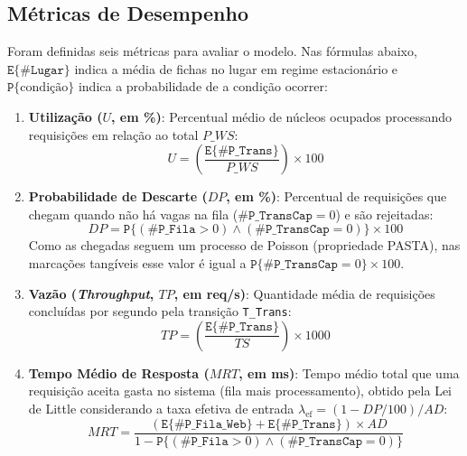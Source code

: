 \documentclass[conference,10pt]{IEEEtran}
\begin{document}
\subsection{Métricas de Desempenho}
Foram definidas seis métricas para avaliar o modelo. Nas fórmulas abaixo, $\texttt{E}\{\#\texttt{Lugar}\}$ indica a média de fichas no lugar em regime estacionário e $\texttt{P}\{\text{condição}\}$ indica a probabilidade de a condição ocorrer:

\begin{enumerate}
    \item \textbf{Utilização ($U$, em \%)}: Percentual médio de núcleos ocupados processando requisições em relação ao total $P\_WS$:
    \begin{equation}
        U = \left(\frac{\texttt{E}\{\#\texttt{P\_Trans}\}}{P\_WS}\right) \times 100
        \label{eq:u}
    \end{equation}

    \item \textbf{Probabilidade de Descarte ($DP$, em \%)}: Percentual de requisições que chegam quando não há vagas na fila ($\#\texttt{P\_TransCap} = 0$) e são rejeitadas:
    \begin{equation}
        DP = \texttt{P}\{(\#\texttt{P\_Fila} > 0) \land (\#\texttt{P\_TransCap} = 0)\} \times 100
        \label{eq:dp}
    \end{equation}
    Como as chegadas seguem um processo de Poisson (propriedade PASTA), nas marcações tangíveis esse valor é igual a $\texttt{P}\{\#\texttt{P\_TransCap} = 0\} \times 100$.

    \item \textbf{Vazão (\textit{Throughput}, $TP$, em req/s)}: Quantidade média de requisições concluídas por segundo pela transição \texttt{T\_Trans}:
    \begin{equation}
        TP = \left(\frac{\texttt{E}\{\#\texttt{P\_Trans}\}}{TS}\right) \times 1000
        \label{eq:tp}
    \end{equation}

    \item \textbf{Tempo Médio de Resposta ($MRT$, em ms)}: Tempo médio total que uma requisição aceita gasta no sistema (fila mais processamento), obtido pela Lei de Little considerando a taxa efetiva de entrada $\lambda_{\text{ef}} = (1 - DP/100)/AD$:
    \begin{equation}
        MRT = \frac{\left(\texttt{E}\{\#\texttt{P\_Fila\_Web}\} + \texttt{E}\{\#\texttt{P\_Trans}\}\right) \times AD}{1 - \texttt{P}\{(\#\texttt{P\_Fila} > 0) \land (\#\texttt{P\_TransCap} = 0)\}}
        \label{eq:mrt}
    \end{equation}


\end{enumerate}
\end{document}
